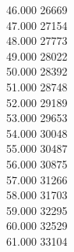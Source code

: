 { 46.000	26669 \\
 47.000	27154 \\
 48.000	27773 \\
 49.000	28022 \\
 50.000	28392 \\
 51.000	28748 \\
 52.000	29189 \\
 53.000	29653 \\
 54.000	30048 \\
 55.000	30487 \\
 56.000	30875 \\
 57.000	31266 \\
 58.000	31703 \\
 59.000	32295 \\
 60.000	32529 \\
 61.000	33104 \\
}
